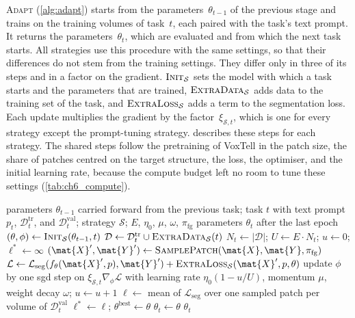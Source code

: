 \textsc{Adapt} (\cref{alg:adapt}) starts from the parameters~$\theta_{t-1}$ of the previous stage and trains on the training volumes of task~$t$, each paired with the task's text prompt.
It returns the parameters~$\theta_t$, which are evaluated and from which the next task starts.
All strategies use this procedure with the same settings, so that their differences do not stem from the training settings.
They differ only in three of its steps and in a factor on the gradient.
$\textsc{Init}_{\mathcal{S}}$ sets the model with which a task starts and the parameters that are trained, $\textsc{ExtraData}_{\mathcal{S}}$ adds data to the training set of the task, and $\textsc{ExtraLoss}_{\mathcal{S}}$ adds a term to the segmentation loss.
Each update multiplies the gradient by the factor~$\xi_{\mathcal{S},t}$, which is one for every strategy except the prompt-tuning strategy.
 describes these steps for each strategy.
The shared steps follow the pretraining of VoxTell in the patch size, the share of patches centred on the target structure, the loss, the optimiser, and the initial learning rate, because the compute budget left no room to tune these settings (\cref{tab:ch6_compute}).

\begin{algorithm}[tb]
\caption{\textsc{Adapt}: adapting VoxTell to task~$t$. The steps with subscript~$\mathcal{S}$ are where the strategies differ (\cref{sec:method-strategies}).}
\label{alg:adapt}
\begin{algorithmic}[1]
\REQUIRE parameters $\theta_{t-1}$ carried forward from the previous task; task $t$ with text prompt $p_t$, $\mathcal{D}_t^{\mathrm{tr}}$, and $\mathcal{D}_t^{\mathrm{val}}$; strategy $\mathcal{S}$; $E$, $\eta_0$, $\mu$, $\omega$, $\pi_{\mathrm{fg}}$
\ENSURE parameters $\theta_t$ after the last epoch
\STATE $(\theta, \phi) \gets \textsc{Init}_{\mathcal{S}}(\theta_{t-1}, t)$ 
\STATE $\mathcal{D} \gets \mathcal{D}_t^{\mathrm{tr}} \cup \textsc{ExtraData}_{\mathcal{S}}(t)$
\STATE $N_t \gets |\mathcal{D}|$; \quad $U \gets E \cdot N_t$; \quad $u \gets 0$; \quad $\ell^{*} \gets \infty$
    \STATE $(\mat{X}', \mat{Y}') \gets \textsc{SamplePatch}(\mat{X}, \mat{Y}, \pi_{\mathrm{fg}})$
    \STATE $\mathcal{L} \gets \mathcal{L}_{\mathrm{seg}}(f_\theta(\mat{X}', p), \mat{Y}') + \textsc{ExtraLoss}_{\mathcal{S}}(\mat{X}', p, \theta)$
    \STATE update $\phi$ by one \gls{sgd} step on $\xi_{\mathcal{S},t} \nabla_\phi \mathcal{L}$ with learning rate $\eta_0 (1 - u/U)$, momentum $\mu$, weight decay $\omega$; \quad $u \gets u + 1$
  \ENDFOR
  \STATE $\ell \gets$ mean of $\mathcal{L}_{\mathrm{seg}}$ over one sampled patch per volume of $\mathcal{D}_t^{\mathrm{val}}$
  \IF{$\ell < \ell^{*}$}
    \STATE $\ell^{*} \gets \ell$; \quad $\theta^{\mathrm{best}} \gets \theta$
  \ENDIF
\ENDFOR
\STATE $\theta_t \gets \theta$ 
\RETURN $\theta_t$
\end{algorithmic}
\end{algorithm}

